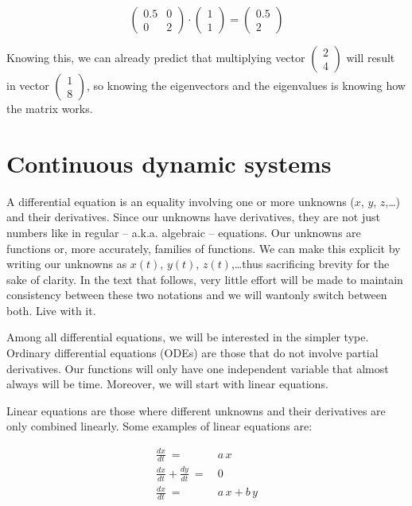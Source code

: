 \documentclass[12pt]{article}
\begin{document}
\begin{equation}
	\begin{pmatrix} 0.5 & 0\\ 0 &  2 \end{pmatrix} \cdot \begin{pmatrix}  1\\ 1 \end{pmatrix} = \begin{pmatrix}  0.5\\ 2 \end{pmatrix}
\end{equation}

Knowing this, we can already predict that multiplying vector $\begin{pmatrix}  2\\ 4 \end{pmatrix}$ will result in vector  $\begin{pmatrix}  1\\ 8 \end{pmatrix}$, so knowing the eigenvectors and the eigenvalues is  knowing how the matrix works.

\FloatBarrier
\section{Continuous dynamic systems}

A differential equation is an equality involving one or more unknowns ($x$, $y$, $z$,\dots) and their derivatives. Since our unknowns have derivatives, they are not just numbers like in regular -- a.k.a. algebraic -- equations. Our unknowns are functions or, more accurately, families of functions. We can make this explicit by writing our unknowns as $x(t)$, $y(t)$, $z(t)$,\dots thus sacrificing brevity for the sake of clarity. In the text that follows, very little effort will be made to maintain consistency between these two notations and we will wantonly switch between both. Live with it.

Among all differential equations, we will be interested in the simpler type. Ordinary differential equations (ODEs) are those that do not involve partial derivatives. Our functions will only have one independent variable that almost always will be time. Moreover, we will start with linear equations.

Linear equations are those where different unknowns and their derivatives are only combined linearly. Some examples of linear equations are:

\begin{align}
	\frac{dx}{dt} \: = \: &  a \, x	\nonumber\\
	\frac{dx}{dt} + \frac{dy}{dt}\: = \: &  0 \nonumber\\
	\frac{dx}{dt} \: = \: &  a \, x + b \, y \nonumber
\end{align}
\end{document}
